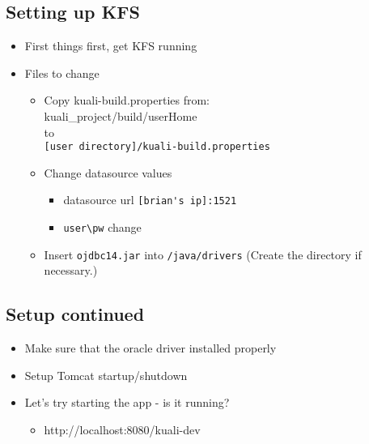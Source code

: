 \begin{ifhtml}
  \begin{s5slide}
    \section{Setting up KFS}
    \begin{itemize}
      \item First things first, get KFS running
      \item Files to change
        \begin{itemize}
          \item Copy kuali-build.properties from: \\
                  kuali_project/build/userHome  \\
                  to \\
                  \verb|[user directory]/kuali-build.properties| \\
          \item Change datasource values
            \begin{itemize}
              \item datasource url \- \verb|[brian's ip]:1521|
              \item \verb|user\pw| change
            \end{itemize}
          \item Insert \verb|ojdbc14.jar| into \verb|/java/drivers| (Create the directory if necessary.)
        \end{itemize}
    \end{itemize}
  \end{s5slide}

  \begin{s5slide}
    \section{Setup continued}
    \begin{itemize}
      \item Make sure that the oracle driver installed properly
      \item Setup Tomcat startup/shutdown
      \item Let's try starting the app - is it running?
        \begin{itemize}
          \item http://localhost:8080/kuali-dev
        \end{itemize}
    \end{itemize}
  \end{s5slide}
\end{ifhtml}
